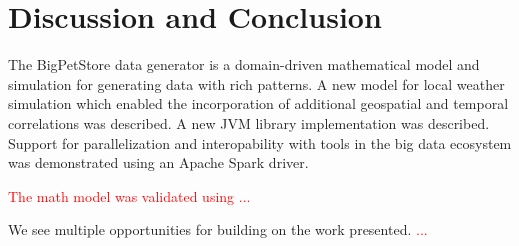\documentclass[conference]{IEEEtran}
\begin{document}


\section{Discussion and Conclusion}
The BigPetStore data generator is a domain-driven mathematical model and simulation for generating data with rich patterns.  A new model for local weather simulation which enabled the incorporation of additional geospatial and temporal correlations was described. A new JVM library implementation was described.  Support for parallelization and interopability with tools in the big data ecosystem was demonstrated using an Apache Spark driver.

\textcolor{red}{The math model was validated using ...}

We see multiple opportunities for building on the work presented.  \textcolor{red}{...}
\end{document}

